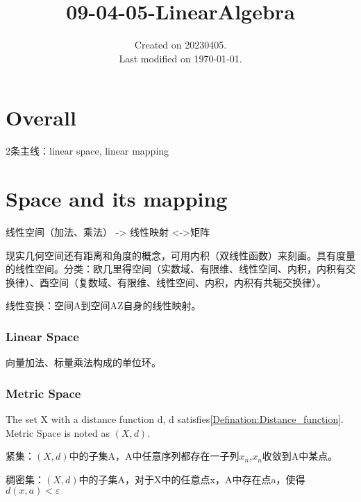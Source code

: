 \documentclass[UTF8]{../../09-Mathematics}
\begin{document}
\title{09-04-05-LinearAlgebra}
\date{Created on 20230405.\\   Last modified on \today.}
\maketitle
\tableofcontents


\chapter{Overall}



2条主线：linear space, linear mapping





\chapter{Space and its mapping}




线性空间（加法、乘法） -> 线性映射 <->矩阵

现实几何空间还有距离和角度的概念，可用内积（双线性函数）来刻画。具有度量的线性空间。分类：欧几里得空间（实数域、有限维、线性空间、内积，内积有交换律）、酉空间（复数域、有限维、线性空间、内积，内积有共轭交换律）。

线性变换：空间A到空间AZ自身的线性映射。

\subsection{Linear Space}

向量加法、标量乘法构成的单位环。


\subsection{Metric Space}

\begin{definition}
    The set X with a distance function d, d satisfies\ref{Defination:Distance_function}. Metric Space is noted as $(X,d)$.
\end{definition}

\begin{definition}
    紧集：$(X,d)$中的子集A，A中任意序列都存在一子列$x_n$,$x_n$收敛到A中某点。
\end{definition}

\begin{definition}
    稠密集：$(X,d)$中的子集A，对于X中的任意点x，A中存在点a，使得$d(x,a)< \varepsilon $
\end{definition}
\end{document}
